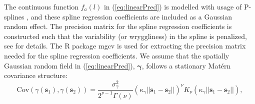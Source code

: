 \documentclass[a4paper 12pt]{article}
\numberwithin{equation}{section}
\begin{document}
The continuous function $f_a(l)$ in (\ref{eq:linearPred}) is modelled with usage of P-splines \citep{wood2017generalized}, and these spline regression coefficients are included as a Gaussian random effect. The precision matrix for the spline regression coefficients is constructed such that the variability (or wryggliness) in the spline is penalized, see \citet[page 239]{wood2017generalized} for details. The R package mgcv \citep{wood2015package} is used for extracting the precision matrix needed for the spline regression coefficients. We assume that the spatially Gaussian random field in (\ref{eq:linearPred}), $\pmb{\gamma}$, follows a stationary Mat\'{e}rn covariance structure:
\begin{equation}\label{eq:matern}
 \text{Cov}(\gamma(\mathbf{s}_1),\gamma(\mathbf{s}_2)) = \frac{\sigma^2_{\gamma}}{2^{\nu-1}\Gamma(\nu)}(\kappa_{\gamma}||\mathbf{s}_1 -\mathbf{s}_2||)^{\nu}K_{\nu}(\kappa_{\gamma}||\mathbf{s}_1-\mathbf{s}_2||),
\end{equation}
\end{document}
